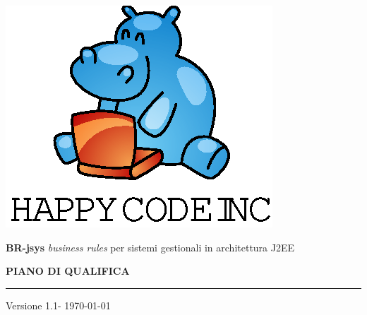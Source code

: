 \documentclass[11pt,titlepage,a4paper]{report}
\begin{document}
\newcommand{\lv}{1.1} %



\begin{titlepage}
\begin{center}
\vspace*{0.5in}
\includegraphics{logo.eps}
\vspace*{0.2in}

{\Large \textbf{BR-jsys}}
{\Large \emph{business rules} per sistemi gestionali in architettura J2EE } 
\vspace{2in}

\LARGE \textbf {PIANO DI QUALIFICA}
\par\rule{10cm}{0.4pt} \par {\large Versione \lv - \today}


\end{center}
\end{titlepage}
\vspace*{0.5in}
\end{document}
